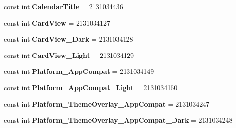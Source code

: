 \begin{DoxyCompactItemize}
\item 
\hypertarget{classClient_1_1Droid_1_1Resource_1_1Style_a192879ec0ed5ca2aaa3a18fa71ab36c9}{}const int {\bfseries Calendar\+Title} = 2131034436\label{classClient_1_1Droid_1_1Resource_1_1Style_a192879ec0ed5ca2aaa3a18fa71ab36c9}

\item 
\hypertarget{classClient_1_1Droid_1_1Resource_1_1Style_a101878d309afc4827e9a715e624dc444}{}const int {\bfseries Card\+View} = 2131034127\label{classClient_1_1Droid_1_1Resource_1_1Style_a101878d309afc4827e9a715e624dc444}

\item 
\hypertarget{classClient_1_1Droid_1_1Resource_1_1Style_a5766e2abbe4965d13584ae21c04a1c16}{}const int {\bfseries Card\+View\+\_\+\+Dark} = 2131034128\label{classClient_1_1Droid_1_1Resource_1_1Style_a5766e2abbe4965d13584ae21c04a1c16}

\item 
\hypertarget{classClient_1_1Droid_1_1Resource_1_1Style_abe366f90affc5c3971626d96dac0ab17}{}const int {\bfseries Card\+View\+\_\+\+Light} = 2131034129\label{classClient_1_1Droid_1_1Resource_1_1Style_abe366f90affc5c3971626d96dac0ab17}

\item 
\hypertarget{classClient_1_1Droid_1_1Resource_1_1Style_a82fee56b5ba641d85f02fbf7a0d305c9}{}const int {\bfseries Platform\+\_\+\+App\+Compat} = 2131034149\label{classClient_1_1Droid_1_1Resource_1_1Style_a82fee56b5ba641d85f02fbf7a0d305c9}

\item 
\hypertarget{classClient_1_1Droid_1_1Resource_1_1Style_af8f32bf0d19c30a1eb39353d4f57e4ad}{}const int {\bfseries Platform\+\_\+\+App\+Compat\+\_\+\+Light} = 2131034150\label{classClient_1_1Droid_1_1Resource_1_1Style_af8f32bf0d19c30a1eb39353d4f57e4ad}

\item 
\hypertarget{classClient_1_1Droid_1_1Resource_1_1Style_a033dde9a2c46f00427242d3816a7f9af}{}const int {\bfseries Platform\+\_\+\+Theme\+Overlay\+\_\+\+App\+Compat} = 2131034247\label{classClient_1_1Droid_1_1Resource_1_1Style_a033dde9a2c46f00427242d3816a7f9af}

\item 
\hypertarget{classClient_1_1Droid_1_1Resource_1_1Style_a499aa13e26880f95d6d3acc0502f223d}{}const int {\bfseries Platform\+\_\+\+Theme\+Overlay\+\_\+\+App\+Compat\+\_\+\+Dark} = 2131034248\label{classClient_1_1Droid_1_1Resource_1_1Style_a499aa13e26880f95d6d3acc0502f223d}


\end{DoxyCompactItemize}
